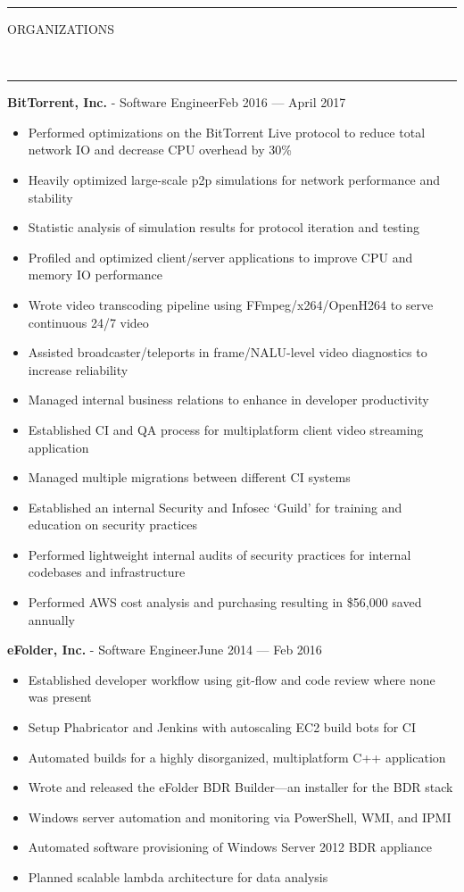\documentclass[10pt, letterpaper, oneside]{article}
\newcommand{\HRule}[2]{\textcolor{#1}{\rule{\linewidth}{#2}}}
\newcommand{\sectiontitle}[1]{\begin{minipage}{\textwidth}\HRule{black}{0.25mm}\vspace{-10pt}\begin{center}\Large\MakeUppercase{#1}\end{center}\end{minipage}\\\HRule{light-grey}{0.15mm}\vspace{\baselineskip}}
\newenvironment{tightressection}[1]{
  \begin{minipage}{\textwidth}
  \sectiontitle{#1}}
  {\vspace{2\baselineskip}\end{minipage}}
\newcommand{\resitem}[1]{
    \vspace{2pt}
    \item \begin{flushleft} #1 \end{flushleft}
}
\newcommand{\resentryheader}[3]{
    \vspace{-5pt}
    \textbf{#1} - #2\hspace{\stretch{1}}\textcolor{light-grey}{#3}\\
}
\newenvironment{resentry}[3]{
  \begin{minipage}{\textwidth}
    \resentryheader{#1}{#2}{#3}
        \vspace{-\baselineskip}
    \begin{itemize}[noitemsep,nolistsep]
}{
    \end{itemize}
        \vspace{\baselineskip}
        \end{minipage}
}
\begin{document}
\begin{tightressection}{Organizations}
  \begin{resentry}{BitTorrent, Inc.}{Software Engineer}{Feb 2016 --- April 2017}
    \resitem{Performed optimizations on the BitTorrent Live protocol to reduce total network IO and decrease CPU overhead by 30\%}
    \resitem{Heavily optimized large-scale p2p simulations for network performance and stability}
    \resitem{Statistic analysis of simulation results for protocol iteration and testing}
    \resitem{Profiled and optimized client/server applications to improve CPU and memory IO performance}
    \resitem{Wrote video transcoding pipeline using FFmpeg/x264/OpenH264 to serve continuous 24/7 video}
    \resitem{Assisted broadcaster/teleports in frame/NALU-level video diagnostics to increase reliability}
    \resitem{Managed internal business relations to enhance in developer productivity}
    \resitem{Established CI and QA process for multiplatform client video streaming application}
    \resitem{Managed multiple migrations between different CI systems}
    \resitem{Established an internal Security and Infosec {\lq}Guild{\rq} for training and education on security practices}
    \resitem{Performed lightweight internal audits of security practices for internal codebases and infrastructure}
    \resitem{Performed AWS cost analysis and purchasing resulting in \$56,000 saved annually}
  \end{resentry}
  \begin{resentry}{eFolder, Inc.}{Software Engineer}{June 2014 --- Feb 2016}
    \resitem{Established developer workflow using git-flow and code review where none was present}
    \resitem{Setup Phabricator and Jenkins with autoscaling EC2 build bots for CI}
    \resitem{Automated builds for a highly disorganized, multiplatform C++ application}
    \resitem{Wrote and released the eFolder BDR Builder---an installer for the BDR stack}
    \resitem{Windows server automation and monitoring via PowerShell, WMI, and IPMI}
    \resitem{Automated software provisioning of Windows Server 2012 BDR appliance}
    \resitem{Planned scalable lambda architecture for data analysis}
  \end{resentry}
\end{tightressection}
\end{document}
